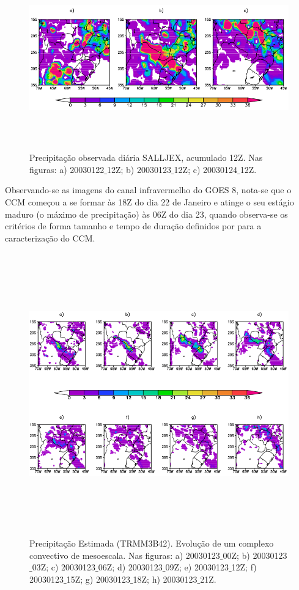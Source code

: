 \begin{figure}
\centering
\includegraphics[height=7.9cm]{./figs/prec_salljex.png}
\caption{Precipitação observada diária SALLJEX, acumulado 12Z. Nas figuras: a) 20030122$\_$12Z; b) 20030123$\_$12Z; c) 20030124$\_$12Z.}
\label{fig15}
\end{figure}

Observando-se as imagens do canal infravermelho do GOES 8, nota-se que o CCM começou a se formar às 18Z do dia 22 de Janeiro e atinge o seu estágio maduro (o máximo de precipitação) às 06Z do dia 23, quando observa-se os critérios de forma tamanho e tempo de duração definidos por  para a caracterização do CCM.

\begin{figure}
\centering
\includegraphics[height=12.2cm]{./figs/prec_trmm.png}
\caption{Precipitação Estimada (TRMM3B42). Evolução de um complexo convectivo de mesoescala. Nas figuras: a) 20030123$\_$00Z; b) 20030123$\_$03Z; c) 20030123$\_$06Z; d) 20030123$\_$09Z; e) 20030123$\_$12Z; f) 20030123$\_$15Z; g) 20030123$\_$18Z; h) 20030123$\_$21Z.}
\label{fig16}
\end{figure}

